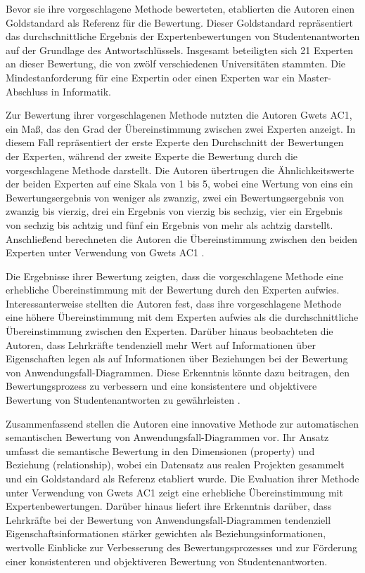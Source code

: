 Bevor sie ihre vorgeschlagene Methode bewerteten, etablierten die Autoren einen Goldstandard als Referenz für die Bewertung. Dieser Goldstandard repräsentiert das durchschnittliche Ergebnis der Expertenbewertungen von Studentenantworten auf der Grundlage des Antwortschlüssels. Insgesamt beteiligten sich 21 Experten an dieser Bewertung, die von zwölf verschiedenen Universitäten stammten. Die Mindestanforderung für eine Expertin oder einen Experten war ein Master-Abschluss in Informatik.

Zur Bewertung ihrer vorgeschlagenen Methode nutzten die Autoren Gwets AC1, ein Maß, das den Grad der Übereinstimmung zwischen zwei Experten anzeigt. In diesem Fall repräsentiert der erste Experte den Durchschnitt der Bewertungen der Experten, während der zweite Experte die Bewertung durch die vorgeschlagene Methode darstellt. Die Autoren übertrugen die Ähnlichkeitswerte der beiden Experten auf eine Skala von 1 bis 5, wobei eine Wertung von eins ein Bewertungsergebnis von weniger als zwanzig, zwei ein Bewertungsergebnis von zwanzig bis vierzig, drei ein Ergebnis von vierzig bis sechzig, vier ein Ergebnis von sechzig bis achtzig und fünf ein Ergebnis von mehr als achtzig darstellt. Anschließend berechneten die Autoren die Übereinstimmung zwischen den beiden Experten unter Verwendung von Gwets AC1 \cite{fauzan2021different}.

Die Ergebnisse ihrer Bewertung zeigten, dass die vorgeschlagene Methode eine erhebliche Übereinstimmung mit der Bewertung durch den Experten aufwies. Interessanterweise stellten die Autoren fest, dass ihre vorgeschlagene Methode eine höhere Übereinstimmung mit dem Experten aufwies als die durchschnittliche Übereinstimmung zwischen den Experten. Darüber hinaus beobachteten die Autoren, dass Lehrkräfte tendenziell mehr Wert auf Informationen über Eigenschaften legen als auf Informationen über Beziehungen bei der Bewertung von Anwendungsfall-Diagrammen. Diese Erkenntnis könnte dazu beitragen, den Bewertungsprozess zu verbessern und eine konsistentere und objektivere Bewertung von Studentenantworten zu gewährleisten \cite{fauzan2021different}.

Zusammenfassend stellen die Autoren eine innovative Methode zur automatischen semantischen Bewertung von Anwendungsfall-Diagrammen vor. Ihr Ansatz umfasst die semantische Bewertung in den Dimensionen (property) und Beziehung (relationship), wobei ein Datensatz aus realen Projekten gesammelt und ein Goldstandard als Referenz etabliert wurde. Die Evaluation ihrer Methode unter Verwendung von Gwets AC1 zeigt eine erhebliche Übereinstimmung mit Expertenbewertungen. Darüber hinaus liefert ihre Erkenntnis darüber, dass Lehrkräfte bei der Bewertung von Anwendungsfall-Diagrammen tendenziell Eigenschaftsinformationen stärker gewichten als Beziehungsinformationen, wertvolle Einblicke zur Verbesserung des Bewertungsprozesses und zur Förderung einer konsistenteren und objektiveren Bewertung von Studentenantworten.

